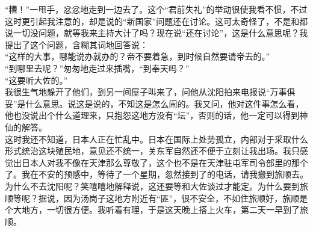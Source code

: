 “糟！”一甩手，忿忿地走到一边去了。这个“君前失礼”的举动很使我看不惯，不过这时更引起我注意的，却是说的“新国家”问题还在讨论。这可太奇怪了，不是和都说一切没问题，就等我来主持大计了吗？现在说“还在讨论”，这是什么意思呢？我提出了这个问题，含糊其词地回答说：\\

“这样的大事，哪能说办就办的？帝不要着急，到时候自然要请帝去的。”\\

“到哪里去呢？”匆匆地走过来插嘴，“到奉天吗？”\\

“这要听大佐的。”\\

我很生气地躲开了他们，到另一间屋子叫来了，问他从沈阳拍来电报说“万事俱妥”是什么意思。说这是说的，不知这是怎么闹的。我又问，他对这件事怎么看，他也没说出个什么道理来，只抱怨这地方没有“坛”，否则的话，他一定可以得到神仙的解答。\\

这时我还不知道，日本人正在忙乱中。日本在国际上处势孤立，内部对于采取什么形式统治这块殖民地，意见还不统一，关东军自然还不便于立刻让我出场。我只感觉出日本人对我不像在天津那么尊敬了，这个也不是在天津驻屯军司令部里的那个了。我在不安的预感中，等待了一个星期，忽然接到了的电话，请我搬到旅顺去。\\

为什么不去沈阳呢？笑嘻嘻地解释说，这还要等和大佐谈过才能定。为什么要到旅顺等呢？据说，因为汤岗子这地方附近有“匪”，很不安全，不如住旅顺好，旅顺是个大地方，一切很方便。我听着有理，于是这天晚上搭上火车，第二天一早到了旅顺。\\

